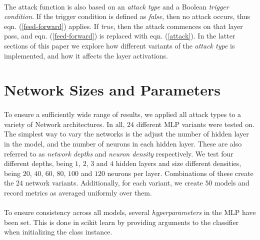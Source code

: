\documentclass[12pt,letterpaper]{article}
\begin{document}
\paragraph*{}The attack function is also based on an \textit{attack type} and a Boolean \textit{trigger condition}. If the trigger condition is defined as \textit{false}, then no attack occurs, thus eqn. (\ref{feed-forward}) applies. If \textit{true}, then the attack commences on that layer pass, and eqn. (\ref{feed-forward}) is replaced with eqn. (\ref{attack}). In the latter sections of this paper we explore how different variants of the \textit{attack type} is implemented, and how it affects the layer activations.


\section*{Network Sizes and Parameters}

\paragraph*{}To ensure a sufficiently wide range of results, we applied all attack types to a variety of Network architectures. In all, $24$ different MLP variants were tested on. The simplest way to vary the networks is the adjust the number of hidden layer in the model, and the number of neurons in each hidden layer. These are also referred to as \textit{network depths} and \textit{neuron density} respectively. We test four different depths, being $1$, $2$, $3$ and $4$ hidden layers and size different densities, being $20$, $40$, $60$, $80$, $100$ and $120$ neurons per layer. Combinations of these create the $24$ network variants. Additionally, for each variant, we create $50$ models and record metrics as averaged uniformly over them.

\paragraph*{}To ensure consistency across all models, several \textit{hyperparameters} in the MLP have been set. This is done in scikit learn by providing arguments to the classifier when initializing the class instance.
\end{document}
